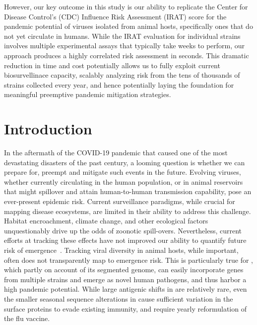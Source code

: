 \documentclass[onecolumn, compsoc,10pt]{IEEEtran}
\begin{document}
However, our key outcome in this study is our ability to replicate the Center for Disease Control's (CDC) Influence Risk Assessment (IRAT) score for the pandemic potential of  \infl  viruses isolated from animal hosts, specifically ones that do not yet circulate in humans. While the IRAT evaluation for individual strains involves multiple experimental assays that typically take weeks to perform, our approach produces a highly correlated risk assessment in seconds. This dramatic reduction in time and cost potentially allows us to fully exploit current biosurvellinace capacity, scalably analyzing risk from  the tens of thousands of strains collected every year, and hence potentially laying the foundation for  meaningful preemptive pandemic mitigation strategies. 


\section*{Introduction}
In the aftermath of the COVID-19 pandemic that caused one of the most devastating disasters of the past century, a looming question is whether we can prepare for, preempt and mitigate such events in the future. Evolving viruses, whether currently circulating in the human population, or in animal reservoirs that might spillover and attain human-to-human transmission capability, pose an ever-present epidemic risk.  Current surveillance paradigms, while crucial for mapping disease ecosystems, are limited in their ability to address this challenge. Habitat encroachment, climate change, and other ecological factors~\cite{rulli2017nexus,chua2002anthropogenic,childs2004zoonotic} unquestionably drive up the odds of zoonotic spill-overs. Nevertheless, current efforts at tracking these effects have not improved our ability to quantify future risk of emergence~\cite{fair2019viral}. Tracking viral diversity in animal hosts, while important, often does not transparently map to emergence risk.  This is particularly true for \infl, which partly on account of its segmented genome, can easily incorporate genes from multiple strains and emerge as novel human pathogens, and thus harbor a high pandemic potential. While large antigenic shifts in \infl are relatively rare, even the smaller seasonal sequence alterations in cause sufficient variation in the surface proteins to evade existing immunity, and require yearly reformulation of the flu vaccine.
\end{document}
